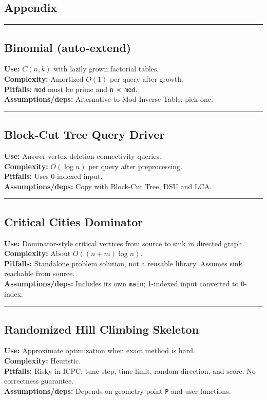 \documentclass[a4paper,landscape]{article}
\newcommand{\alg}[6]{
\par\noindent\rule{\linewidth}{0.4pt}\par
\subsection{#1}
\textbf{Use:} #2\\
\textbf{Complexity:} #3\\
\textbf{Pitfalls:} #4\\
\textbf{Assumptions/deps:} #5

}
\newcommand{\newnotebooksection}[1]{%
\setlength{\maxbalancingoverflow}{0pt}%
\end{multicols}%
\clearpage
\begin{multicols}{2}%
\section{#1}%
}
\begin{document}
\begin{multicols}{2}
\newnotebooksection{Appendix}
\alg{Binomial (auto-extend)}{$C(n,k)$ with lazily grown factorial tables.}{Amortized $O(1)$ per query after growth.}{\texttt{mod} must be prime and \texttt{n < mod}.}{Alternative to Mod Inverse Table; pick one.}{sections/math/binom.cpp}
\alg{Block-Cut Tree Query Driver}{Answer vertex-deletion connectivity queries.}{$O(\log n)$ per query after preprocessing.}{Uses 0-indexed input.}{Copy with Block-Cut Tree, DSU and LCA.}{sections/graph/block_cut_tree_example.cpp}
\alg{Critical Cities Dominator}{Dominator-style critical vertices from source to sink in directed graph.}{About $O((n+m)\log n)$.}{Standalone problem solution, not a reusable library. Assumes sink reachable from source.}{Includes its own \texttt{main}; 1-indexed input converted to 0-index.}{sections/graph/critical_cities_dominator.cpp}
\alg{Randomized Hill Climbing Skeleton}{Approximate optimization when exact method is hard.}{Heuristic.}{Risky in ICPC: tune step, time limit, random direction, and score. No correctness guarantee.}{Depends on geometry point \texttt{P} and user functions.}{sections/misc/simulated_annealing.cpp}

\end{multicols}
\end{document}
